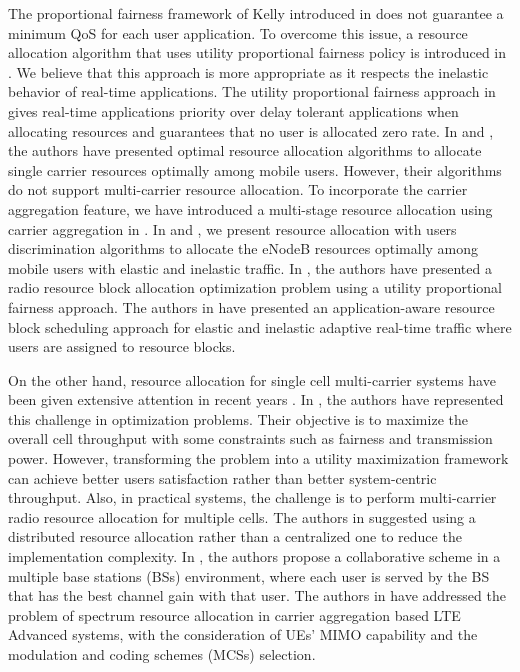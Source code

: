 \documentclass[journal]{IEEEtran} 		\usepackage{amsmath,amssymb}
\begin{document}
The proportional fairness framework of Kelly introduced in \cite{kelly98ratecontrol} does not guarantee a minimum QoS for each user application. To overcome this issue, a resource allocation algorithm that uses utility proportional fairness policy is introduced in \cite{Ahmed_Utility1}. We believe that this approach is more appropriate as it respects the inelastic behavior of real-time applications. The utility proportional fairness approach in \cite{Ahmed_Utility1} gives real-time applications priority over delay tolerant applications when allocating resources and guarantees that no user is allocated zero rate. In \cite{Ahmed_Utility1, Ahmed_Utility2} and \cite{ Ahmed_Utility3}, the authors have presented optimal resource allocation algorithms to allocate single carrier resources optimally among mobile users. However, their algorithms do not support multi-carrier resource allocation. To incorporate the carrier aggregation feature, we have introduced a multi-stage resource allocation using carrier
aggregation in \cite{Haya_Utility1}. In \cite{Haya_Utility2} and \cite{Haya_Utility4}, we present resource allocation with users discrimination algorithms to allocate the eNodeB resources optimally among mobile users with elastic and inelastic traffic. In \cite{Mo_ResourceBlock}, the authors have presented a radio resource block allocation optimization problem using a utility proportional fairness approach. The authors in \cite{Tugba_ApplicationAware} have presented an application-aware resource block scheduling approach for elastic and inelastic
adaptive real-time traffic where users are assigned to resource blocks.

On the other hand, resource allocation for single cell multi-carrier systems have been given extensive attention in recent years \cite{Dual-Decomposition, Resource_allocation, Rate_Balancing}. In \cite{Fair_resource,Design_of_Fair,Fast_Algorithms,Optimal_and_near-optimal}, the authors have represented this challenge in optimization problems. Their objective is to maximize the overall cell throughput with some constraints such as fairness and transmission power. However, transforming the problem into a utility maximization framework can achieve better users satisfaction rather than better system-centric throughput. Also, in practical systems, the challenge is to perform multi-carrier radio resource allocation for multiple cells. The authors in \cite{Downlink_dynamic,Centralized_vs_Distributed} suggested using a distributed resource allocation rather than a centralized one to reduce the implementation complexity. In \cite{Cooperative_Fair_Scheduling}, the authors propose a collaborative scheme in a multiple
base stations (BSs) environment, where each user is served by the BS that has the best channel gain with that user. The authors in \cite{DownlinkRadio} have addressed the problem of spectrum resource allocation in carrier aggregation based LTE Advanced systems, with the consideration of UEs’ MIMO capability and the modulation and coding schemes (MCSs) selection.
\end{document}
